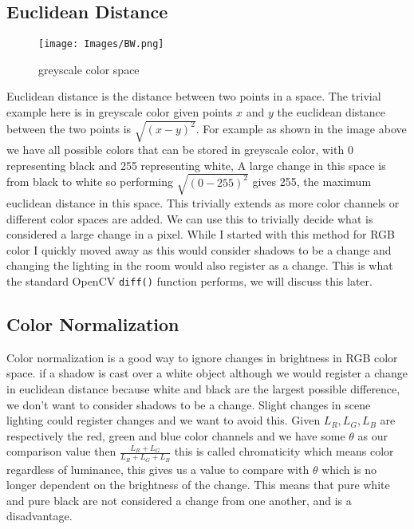 \documentclass[a4paper]{report}
\begin{document}
\subsection{Euclidean Distance}
\begin{figure}[!ht]
\centering
\texttt{[image: Images/BW.png]}
\caption{\label{fig:BW} greyscale color space}
\end{figure}
Euclidean distance is the distance between two points in a space. The trivial example here is in greyscale color given points $x$ and $y$ the euclidean distance between the two points is $\sqrt{(x-y)^2}$. For example as shown in the image above we have all possible colors that can be stored in greyscale color, with 0 representing black and 255 representing white, A large change in this space is from black to white so performing $\sqrt{(0-255)^2}$ gives 255, the maximum euclidean distance in this space. This trivially extends as more color channels or different color spaces are added. We can use this to trivially decide what is considered a large change in a pixel. While I started with this method for RGB color I quickly moved away as this would consider shadows to be a change and changing the lighting in the room would also register as a change. This is what the standard OpenCV \verb|diff()| function performs, we will discuss this later.

\subsection{Color Normalization}
Color normalization is a good way to ignore changes in brightness in RGB color space. if a shadow is cast over a white object although we would register a change in euclidean distance because white and black are the largest possible difference, we don't want to consider shadows to be a change. Slight changes in scene lighting could register changes and we want to avoid this. Given $L_R,L_G,L_B$ are respectively the red, green and blue color channels and we have some $\theta$ as our comparison value then $\frac{L_R + L_G}{L_R + L_G + L_B}$ this is called chromaticity which means color regardless of luminance, this gives us a value to compare with $\theta$ which is no longer dependent on the brightness of the change. This means that pure white and pure black are not considered a change from one another, and is a disadvantage.
\end{document}

